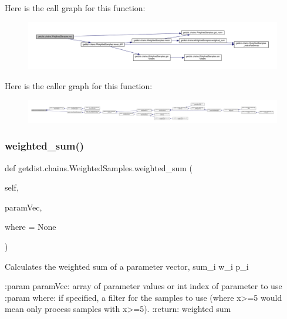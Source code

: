Here is the call graph for this function\+:
\nopagebreak
\begin{figure}[H]
\begin{center}
\leavevmode
\includegraphics[width=350pt]{classgetdist_1_1chains_1_1WeightedSamples_a0ee200487592ebb5723da33f43724e4f_cgraph}
\end{center}
\end{figure}
Here is the caller graph for this function\+:
\nopagebreak
\begin{figure}[H]
\begin{center}
\leavevmode
\includegraphics[width=350pt]{classgetdist_1_1chains_1_1WeightedSamples_a0ee200487592ebb5723da33f43724e4f_icgraph}
\end{center}
\end{figure}
\mbox{\label{classgetdist_1_1chains_1_1WeightedSamples_afdeb6d07f1db505f36fe0ca0052528ac}} 
\subsubsection{\texorpdfstring{weighted\+\_\+sum()}{weighted\_sum()}}
{\footnotesize\ttfamily def getdist.\+chains.\+Weighted\+Samples.\+weighted\+\_\+sum (\begin{DoxyParamCaption}\item[{}]{self,  }\item[{}]{param\+Vec,  }\item[{}]{where = {\ttfamily None} }\end{DoxyParamCaption})}

\begin{DoxyVerb}Calculates the weighted sum of a parameter vector, sum_i w_i p_i

:param paramVec: array of parameter values or int index of parameter to use
:param where: if specified, a filter for the samples to use (where x>=5 would mean only process samples with x>=5).
:return: weighted sum
\end{DoxyVerb}
 


